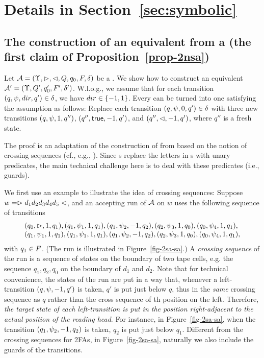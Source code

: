 \section{Details in Section~\ref{sec:symbolic}}\label{app-sym}

\subsection{The construction of an equivalent \SA{} from a \SSA{}(the first claim of Proposition~\ref{prop-2nsa})}

Let $\mathcal{A} = (\Upsilon, \vartriangleright, \vartriangleleft, Q, q_0, F, \delta)$ be a \SSA. We show how to construct an equivalent \SA{} $\mathcal{A}' =  (\Upsilon, Q', q'_0, F', \delta')$.
W.l.o.g., we assume that for each transition $(q, \psi, dir, q') \in \delta$, we have $dir \in \{-1,1\}$. Every \SSA{} can be turned into one \SSA{} satisfying the assumption as follows: Replace each transition $(q, \psi, 0, q') \in \delta$ with three new transitions $(q, \psi, 1, q'')$, $(q'', \mathsf{true}, -1, q')$, and $(q'', \vartriangleleft, -1, q')$, where $q''$ is a fresh state.

The proof is an adaptation of the construction of \FA{} from \FFA{} based on the notion of crossing sequences (cf., e.g., \cite{HU79}). Since \SSA{}s replace the letters in \FFA{}s with unary predicates, the main technical challenge here is to deal with these predicates (i.e., guards).

We first use an example to illustrate the idea of crossing sequences: Suppose $w = \vartriangleright d_1 d_2 d_3 d_4 d_5\vartriangleleft$, and an accepting run of $\mathcal{A}$ on $w$ uses the following sequence of transitions 
\[
\begin{array}{l}
(q_0, \vartriangleright, 1, q_1), (q_1, \psi_1, 1, q_1), (q_1, \psi_2, -1, q_2), (q_2, \psi_3, 1, q_0), (q_0, \psi_4, 1, q_1), \\
(q_1, \psi_1, 1, q_1), (q_1, \psi_1, 1, q_1), (q_1, \psi_2, -1, q_2), (q_2, \psi_3, 1, q_0), (q_0, \psi_4, 1, q_1),
\end{array}
\] 
with $q_1 \in F$.
(The run is illustrated in Figure~\ref{fig-2sa-sa}.) A \emph{crossing sequence} of the run is a sequence of states on the boundary of two tape cells, e.g. the sequence $q_1, q_2, q_0$ on the boundary of $d_1$ and $d_2$. Note that for technical convenience, the states of the run are put in a way that, whenever a left-transition $(q, \psi, -1, q')$ is taken, $q'$ is put just below $q$, thus in the \emph{same} crossing sequence as $q$ rather than the cross sequence of th position on the left. Therefore, 
\emph{the target state of each left-transition is put in the position right-adjacent to the actual position of the reading head}.
For instance, in Figure~\ref{fig-2sa-sa}, when the transition $(q_1, \psi_2, -1, q_2)$ is taken, $q_2$ is put just below $q_1$. Different from the crossing sequences for 2FAs, in Figure~\ref{fig-2sa-sa}, naturally we also include the guards of the transitions. 

